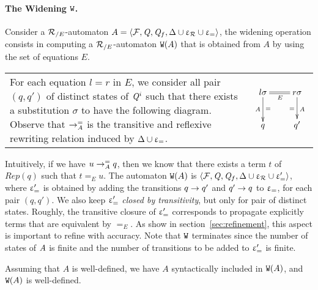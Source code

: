 \paragraph{The Widening  $\mathtt{W}$.}
Consider a ${\mathcal R_{/E}}$-automaton $A = \langle \mathcal{F}, \mathit Q, \mathit Q_f, \Delta \cup \upvarepsilon_{\mathcal R}
\cup \upvarepsilon_{=} \rangle$, the widening operation consists in computing a
${\mathcal R_{/E}}$-automaton $\mathtt{W}(A)$ that is obtained from $A$ by using the set
of equations $E$.

\begin{tabular}{lc}
  \hspace{-1.1cm}
  \begin{minipage}{.75\linewidth}
    For each equation $l = r$ in $E$, we consider all pair
    $(q, q')$ of distinct states of $\mathit Q^i$ such that there exists a
    substitution $\sigma$ to have the following diagram.
    Observe that $\rightarrow^=_{A}$ is the transitive and reflexive
    rewriting relation induced by $\Delta \cup \upvarepsilon_{=}$.  
  \end{minipage}&
  \begin{minipage}{.25\linewidth}
    $\xymatrix{
      l\sigma \ar@{=}[r]_{E}\ar[d]^{=}_{A} & r\sigma \ar[d]^{A}_{=}\\
      q & q'
    }$
  \end{minipage}
\end{tabular}

Intuitively, if we have $u \rightarrow^=_{A} q$, then we know that there
exists a term $t$ of $Rep(q)$ such that $t =_E u$. The automaton
$\mathtt{W}(A)$ is $\langle \mathcal{F}, \mathit Q, \mathit Q_f, \Delta \cup \upvarepsilon_{\mathcal R} \cup \upvarepsilon_{=}' \rangle$,
where $\upvarepsilon_{=}'$ is obtained by adding the transitions $q \rightarrow q'$ and $q'
\rightarrow q$ to $\upvarepsilon_{=}$, for each pair $(q, q')$. We also keep $\upvarepsilon_{=}'$ {\em
  closed by transitivity}, but only for pair of distinct states.
Roughly, the transitive closure of $\upvarepsilon_{=}'$ corresponds to propagate
explicitly terms that are equivalent by $=_E$.  As show in
section~\ref{sec:refinement}, this aspect is important to refine with
accuracy. Note that $\mathtt{W}$ terminates since the number of states of
$\mathit A$ is finite and the number of transitions to be added to $\upvarepsilon_{=}'$ is
finite.

\begin{theorem}
  \label{thm:W}
  Assuming that $A$ is well-defined, we have $A $ syntactically included in 
  $ \mathtt{W}(A)$, and $\mathtt{W}(A)$ is well-defined.
\end{theorem}

